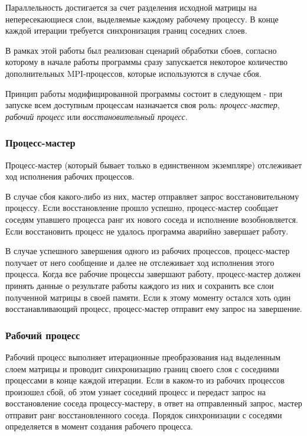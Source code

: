 \documentclass[a4paper]{article}
\begin{document}
Параллельность достигается за счет разделения исходной матрицы на непересекающиеся слои, выделяемые каждому рабочему процессу. В конце каждой итерации требуется синхронизация границ соседних слоев.

В рамках этой работы был реализован сценарий обработки сбоев, согласно которому в начале работы программы сразу запускается некоторое количество дополнительных MPI-процессов, которые используются в случае сбоя.

Принцип работы модифицированной программы состоит в следующем - при запуске всем доступным процессам назначается своя роль: \textit{процесс-мастер}, \textit{рабочий процесс} или \textit{восстановительный процесс}.

\subsubsection{Процесс-мастер}

Процесс-мастер (который бывает только в единственном экземпляре) отслеживает ход исполнения рабочих процессов.

В случае сбоя какого-либо из них, мастер отправляет запрос восстановительному процессу. Если восстановление прошло успешно, процесс-мастер сообщает соседям упавшего процесса ранг их нового соседа и исполнение возобновляется. Если восстановить процесс не удалось программа аварийно завершает работу.

В случае успешного завершения одного из рабочих процессов, процесс-мастер получает от него сообщение и далее не отслеживает ход исполнения этого процесса. Когда все рабочие процессы завершают работу, процесс-мастер должен принять данные о результате работы каждого из них и сохранить все слои полученной матрицы в своей памяти. Если к этому моменту остался хоть один восстанавливающий процесс, процесс-мастер отправит ему запрос на завершение.

\subsubsection{Рабочий процесс}

Рабочий процесс выполняет итерационные преобразования над выделенным слоем матрицы и проводит синхронизацию границ своего слоя с соседними процессами в конце каждой итерации. Если в каком-то из рабочих процессов произошел сбой, об этом узнает соседний процесс и передаст запрос на восстановление соседа процессу-мастеру, в ответ на отправленный запрос, мастер отправит ранг восстановленного соседа. Порядок синхронизации с соседями определяется в момент создания рабочего процесса.
\end{document}
